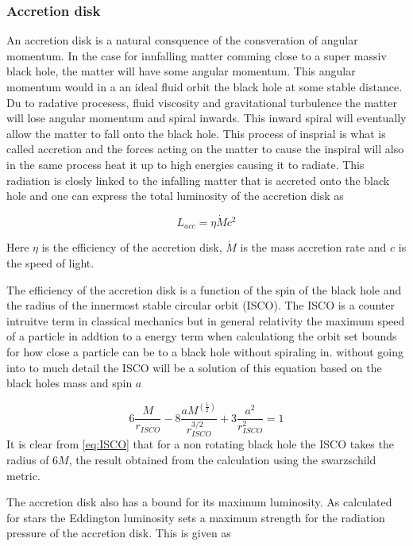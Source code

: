 \documentclass{article}
\begin{document}
\subsubsection{Accretion disk}
An accretion disk is a natural consquence of the consveration of angular momentum. In the case for innfalling 
matter comming close to a super massiv black hole, the matter will have some angular momentum. This angular momentum would in a 
an ideal fluid orbit the black hole at some stable distance. Du to radative procesess, fluid viscosity and gravitational turbulence 
the matter will lose angular momentum and spiral inwards. This inward spiral will eventually allow the matter to fall onto the black hole. 
This process of insprial is what is called accretion and the forces acting on the matter to cause the inspiral 
will also in the same process heat it up to high energies causing it to radiate. This radiation is closly linked to the 
infalling matter that is accreted onto the black hole and one can express the total luminosity of the accretion disk as 

\begin{equation}
    L_{acc} = \eta \dot{M}c^2
    \label{eq:accretion_luminosity}
\end{equation}

Here $\eta$ is the efficiency of the accretion disk, $\dot{M}$ is the mass accretion rate and $c$ is the speed of light.

The efficiency of the accretion disk is a function of the spin of the black hole and the radius of the innermost stable circular orbit (ISCO).
The ISCO is a counter intruitve term in classical mechanics but in general relativity the maximum speed of a particle 
in addtion to a energy term when calculationg the orbit set bounds for how close a particle can be to 
a black hole without spiraling in. without going into to much detail the ISCO will be a solution of this equation based on the black holes mass and spin $a$

\begin{equation}
    6\frac{M}{r_{ISCO}}-8\frac{aM^(\frac{1}{2})}{r^{3/2}_{ISCO}}+3\frac{a^2}{r_{ISCO}^2} = 1
    \label{eq:ISCO}
\end{equation}
It is clear from \ref{eq:ISCO} that for a non rotating black hole the ISCO takes the radius of $6M$, the result obtained from the calculation using the swarzschild metric.


The accretion disk also has a bound for its maximum luminosity. As calculated for stars the Eddington
luminosity sets a maximum strength for the radiation pressure of the accretion disk. This is given as
\end{document}
